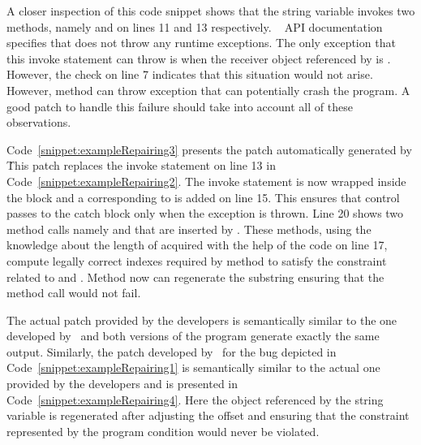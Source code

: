 A closer inspection of this code snippet shows that the string variable
 invokes two methods, namely  and 
on lines 11 and 13 respectively. \java\  API documentation
specifies that  does not throw any runtime exceptions. The only
exception that this invoke statement can throw is when the receiver object
referenced by  is . However, the check on line 7
indicates that this situation would not arise. However, method 
can throw  exception that can potentially crash
the program. A good patch to handle this failure should take into account all of
these observations. 

Code~\ref{snippet:exampleRepairing3} presents the patch automatically generated
by \tool\. This patch replaces the invoke statement on line 13 in
Code~\ref{snippet:exampleRepairing2}. The invoke statement is now wrapped inside
the  block and a  corresponding to
 is added on line 15. This ensures that
control passes to the catch block only when the exception is thrown. Line 20
shows two method calls namely  and  that are
inserted by \tool. These methods, using the knowledge about the length of
 acquired with the help of the code on line 17, compute legally
correct indexes required by  method to satisfy the constraint
related to  and . Method  now
can regenerate the substring ensuring that the method call would not fail. 

The actual patch provided by the developers is semantically similar to the one
developed by \tool\ and both versions of the program generate exactly the same
output. Similarly, the patch developed by \tool\ for the bug depicted in
Code~\ref{snippet:exampleRepairing1} is semantically similar to the actual one
provided by the developers and is presented in
Code~\ref{snippet:exampleRepairing4}. Here the object referenced by the string
variable  is regenerated after adjusting the offset and ensuring that
the constraint represented by the program condition 
would never be violated.


